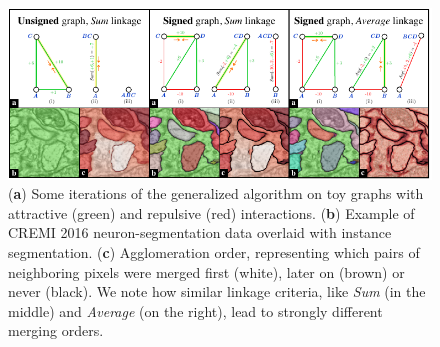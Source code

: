 \begin{figure}[t]
\centering
\includegraphics[width=\textwidth]{./figs/intro_image.pdf} %
\caption{
 (\textbf{a}) Some iterations of the generalized algorithm on toy graphs with attractive (green) and repulsive (red) interactions. (\textbf{b}) Example of CREMI 2016 neuron-segmentation data \cite{cremiChallenge} overlaid with instance segmentation. (\textbf{c}) Agglomeration order, representing which pairs of neighboring pixels were merged first (white), later on (brown) or never (black).
We note how similar linkage criteria, like \emph{Sum} (in the middle) and \emph{Average} (on the right), lead to strongly different merging orders. 
\label{fig:intro_figure}}
\end{figure}
